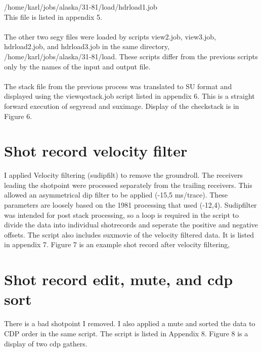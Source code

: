 /home/karl/jobs/alaska/31-81/load/hdrload1.job \\
This file is listed in appendix 5.\\
\\
The other two segy files were loaded by scripts view2.job, view3.job, hdrload2.job, and hdrload3.job in the same  directory, /home/karl/jobs/alaska/31-81/load.  These scripts differ from the previous scripts only by the names of the input and output file.\\
\\
The stack file from the previous process was translated to SU format and displayed using the viewqcstack.job script listed in appendix 6.  This is a straight forward execution of segyread and suximage.  Display of the checkstack is in Figure 6.\\


\section{Shot record velocity filter}
I applied Velocity filtering (sudipfilt) to remove the groundroll.  The receivers leading the shotpoint were processed separately from the trailing receivers.  This allowed an asymmetrical dip filter to be applied (-15,5 ms/trace).  These parameters are loosely based on the 1981 processing that used (-12,4). Sudipfilter was intended for post stack processing, so a loop is required in the script to divide the data into individual shotrecords and seperate the positive and negative offsets.  The script also includes suxmovie of the velocity filtered data.  It is listed in appendix 7.  Figure 7 is an example shot record after velocity filtering,\\


\section{Shot record edit, mute, and cdp sort}
There is a bad shotpoint I removed.  I also applied a mute  and sorted the data to CDP order in the same script.  The script is listed in Appendix 8.  Figure 8 is a display of two cdp gathers.\\


